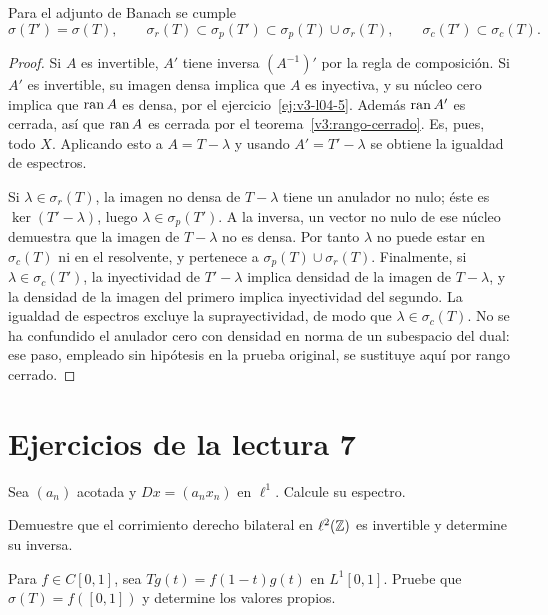 \begin{teorema}\label{v3:espectro-adjunto}
Para el adjunto de Banach se cumple
\[\sigma(T')=\sigma(T),\qquad
\sigma_r(T)\subset\sigma_p(T')\subset\sigma_p(T)\cup\sigma_r(T),\qquad
\sigma_c(T')\subset\sigma_c(T).
\]
\end{teorema}
\begin{proof}
Si $A$ es invertible, $A'$ tiene inversa $(A^{-1})'$ por la regla de composición. Si $A'$ es invertible, su imagen densa implica que $A$ es inyectiva, y su núcleo cero implica que $\operatorname{ran} A$ es densa, por el ejercicio~\ref{ej:v3-l04-5}. Además $\operatorname{ran} A'$ es cerrada, así que $\operatorname{ran} A$ es cerrada por el teorema~\ref{v3:rango-cerrado}. Es, pues, todo $X$. Aplicando esto a $A=T-\lambda$ y usando $A'=T'-\lambda$ se obtiene la igualdad de espectros.

Si $\lambda\in\sigma_r(T)$, la imagen no densa de $T-\lambda$ tiene un anulador no nulo; éste es $\ker(T'-\lambda)$, luego $\lambda\in\sigma_p(T')$. A la inversa, un vector no nulo de ese núcleo demuestra que la imagen de $T-\lambda$ no es densa. Por tanto $\lambda$ no puede estar en $\sigma_c(T)$ ni en el resolvente, y pertenece a $\sigma_p(T)\cup\sigma_r(T)$. Finalmente, si $\lambda\in\sigma_c(T')$, la inyectividad de $T'-\lambda$ implica densidad de la imagen de $T-\lambda$, y la densidad de la imagen del primero implica inyectividad del segundo. La igualdad de espectros excluye la suprayectividad, de modo que $\lambda\in\sigma_c(T)$. No se ha confundido el anulador cero con densidad en norma de un subespacio del dual: ese paso, empleado sin hipótesis en la prueba original, se sustituye aquí por rango cerrado.
\end{proof}

\section{Ejercicios de la lectura 7}
\begin{ejercicio}\label{ej:v3-l07-1}
Sea $(a_n)$ acotada y $Dx=(a_nx_n)$ en $\ell^1$. Calcule su espectro.
\end{ejercicio}


\begin{ejercicio}\label{ej:v3-l07-2}
Demuestre que el corrimiento derecho bilateral en $\ell^2(\mathbb Z)$ es invertible y determine su inversa.
\end{ejercicio}


\begin{ejercicio}\label{ej:v3-l07-3}
Para $f\in C[0,1]$, sea $Tg(t)=f(1-t)g(t)$ en $L^1[0,1]$. Pruebe que $\sigma(T)=f([0,1])$ y determine los valores propios.
\end{ejercicio}


